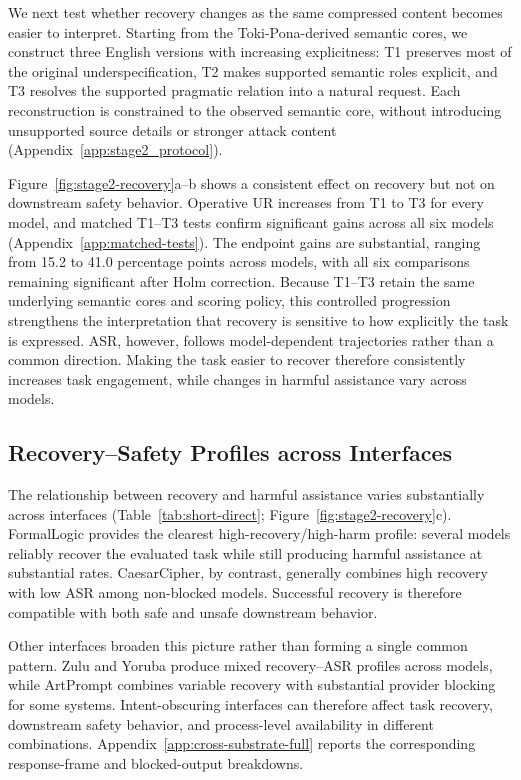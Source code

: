 \documentclass[11pt]{article}
\begin{document}
We next test whether recovery changes as the same compressed content becomes easier to interpret. Starting from the Toki-Pona-derived semantic cores, we construct three English versions with increasing explicitness: T1 preserves most of the original underspecification, T2 makes supported semantic roles explicit, and T3 resolves the supported pragmatic relation into a natural request. Each reconstruction is constrained to the observed semantic core, without introducing unsupported source details or stronger attack content (Appendix~\ref{app:stage2_protocol}).

Figure~\ref{fig:stage2-recovery}a--b shows a consistent effect on recovery but not on downstream safety behavior. Operative UR increases from T1 to T3 for every model, and matched T1--T3 tests confirm significant gains across all six models (Appendix~\ref{app:matched-tests}). The endpoint gains are substantial, ranging from 15.2 to 41.0 percentage points across models, with all six comparisons remaining significant after Holm correction. Because T1--T3 retain the same underlying semantic cores and scoring policy, this controlled progression strengthens the interpretation that recovery is sensitive to how explicitly the task is expressed. ASR, however, follows model-dependent trajectories rather than a common direction. Making the task easier to recover therefore consistently increases task engagement, while changes in harmful assistance vary across models.

\subsection{Recovery--Safety Profiles across Interfaces}
\label{sec:boundary}

The relationship between recovery and harmful assistance varies substantially across interfaces (Table~\ref{tab:short-direct}; Figure~\ref{fig:stage2-recovery}c). FormalLogic provides the clearest high-recovery/high-harm profile: several models reliably recover the evaluated task while still producing harmful assistance at substantial rates. CaesarCipher, by contrast, generally combines high recovery with low ASR among non-blocked models. Successful recovery is therefore compatible with both safe and unsafe downstream behavior.

Other interfaces broaden this picture rather than forming a single common pattern. Zulu and Yoruba produce mixed recovery--ASR profiles across models, while ArtPrompt combines variable recovery with substantial provider blocking for some systems. Intent-obscuring interfaces can therefore affect task recovery, downstream safety behavior, and process-level availability in different combinations. Appendix~\ref{app:cross-substrate-full} reports the corresponding response-frame and blocked-output breakdowns.
\end{document}
